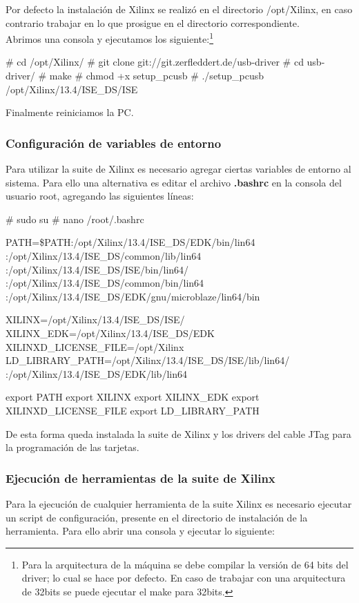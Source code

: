 Por defecto la instalación de Xilinx se realizó en el directorio /opt/Xilinx, en caso contrario trabajar en lo que prosigue en el directorio correspondiente.\\

Abrimos una consola y ejecutamos los siguiente:\footnote{Para la arquitectura de la máquina se debe compilar la versión de 64 bits del driver; lo cual se hace por defecto. En caso de trabajar con una arquitectura de 32bits se puede ejecutar el make para 32bits.}\\

\begin{bash}
# cd /opt/Xilinx/
# git clone git://git.zerfleddert.de/usb-driver
# cd usb-driver/
# make
# chmod +x setup_pcusb
# ./setup_pcusb /opt/Xilinx/13.4/ISE_DS/ISE
\end{bash}

Finalmente reiniciamos la PC.

\subsubsection{Configuración de variables de entorno}
Para utilizar la suite de Xilinx es necesario agregar ciertas variables de entorno al sistema. Para ello una alternativa es editar el archivo \textbf{.bashrc} en la consola del usuario root, agregando las siguientes líneas:\\

\begin{bash}
# sudo su
# nano /root/.bashrc

PATH=\$PATH:/opt/Xilinx/13.4/ISE_DS/EDK/bin/lin64
:/opt/Xilinx/13.4/ISE_DS/common/lib/lin64
:/opt/Xilinx/13.4/ISE_DS/ISE/bin/lin64/
:/opt/Xilinx/13.4/ISE_DS/common/bin/lin64
:/opt/Xilinx/13.4/ISE_DS/EDK/gnu/microblaze/lin64/bin

XILINX=/opt/Xilinx/13.4/ISE_DS/ISE/
XILINX_EDK=/opt/Xilinx/13.4/ISE_DS/EDK
XILINXD_LICENSE_FILE=/opt/Xilinx
LD_LIBRARY_PATH=/opt/Xilinx/13.4/ISE_DS/ISE/lib/lin64/
:/opt/Xilinx/13.4/ISE_DS/EDK/lib/lin64

export PATH
export XILINX
export XILINX_EDK
export XILINXD_LICENSE_FILE
export LD_LIBRARY_PATH
\end{bash}

De esta forma queda instalada la suite de Xilinx y los drivers del cable JTag para la programación de las tarjetas.

\subsubsection{Ejecución de herramientas de la suite de Xilinx}
Para la ejecución de cualquier herramienta de la suite Xilinx es necesario ejecutar un script de configuración, presente en el directorio de instalación de la herramienta. Para ello abrir una consola y ejecutar lo siguiente:\\


